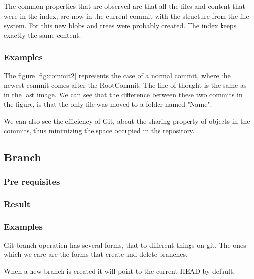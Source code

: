 The common properties that are observed are that all the files and
content that were in the index, are now in the current commit with the
structure from the file system. For this new blobs and trees were
probably created. The index keeps exactly the same content.

\subsubsection{Examples}


The figure \ref{fig:commit2} represents the case of a normal commit, where the
newest commit comes after the RootCommit. The line of thought is the same as in
the last image. We can see that the difference between these two commits in the
figure, is that the only file was moved to a folder named "Name". \par
We can also see the efficiency of Git, about the sharing property of objects in
the commits, thus minimizing the space occupied in the repository. \par
\subsection{Branch}

\subsubsection{Pre requisites}

\subsubsection{Result}

\subsubsection{Examples}
Git branch operation has several forms, that to different things on git.
The ones which we care are the forms that create and delete branches. \par
When a new branch is created it will point to the current HEAD by default.
\par


